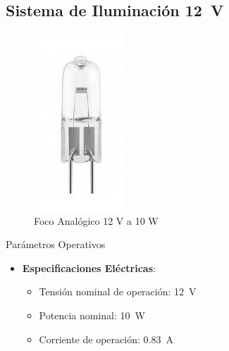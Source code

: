 \subsection{Sistema de Iluminación \SI{12}{\volt}}
\begin{figure}[H]
	\centering
	\includegraphics[width=0.3\textwidth]{images/foco}
	\caption{Foco Analógico 12 V a 10 W}
	\label{fig:foco}
\end{figure}
\begin{componentBox}{Parámetros Operativos \citep{boylestad2013electronic}}
	\begin{itemize}[leftmargin=*,itemsep=1pt,parsep=1pt]
		\item \textbf{Especificaciones Eléctricas}:
		\begin{itemize}[itemsep=0pt,parsep=0pt]
			\item Tensión nominal de operación: \SI{12}{\volt}
			\item Potencia nominal: \SI{10}{\watt}
			\item Corriente de operación: \SI{0.83}{\ampere}
		\end{itemize}
	\end{itemize}
\end{componentBox}